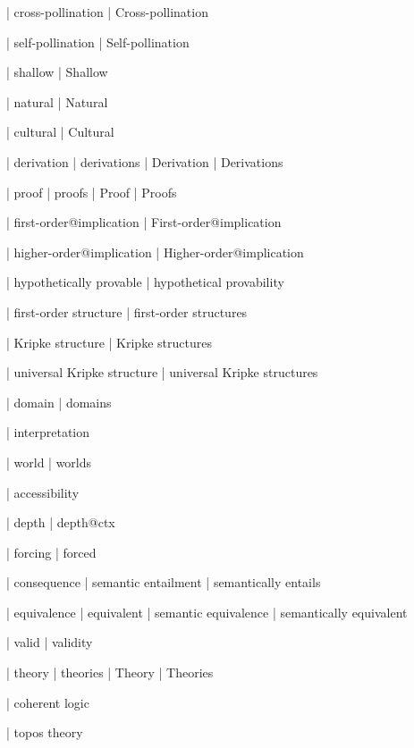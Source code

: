  | cross-pollination
 | Cross-pollination

 | self-pollination
 | Self-pollination

 | shallow
 | Shallow

 | natural
 | Natural

 | cultural
 | Cultural

 | derivation
 | derivations
 | Derivation
 | Derivations

 | proof
 | proofs
 | Proof
 | Proofs
 
 | first-order@implication
 | First-order@implication

 | higher-order@implication
 | Higher-order@implication

 | hypothetically provable
 | hypothetical provability

 | first-order structure
 | first-order structures

 | Kripke structure
 | Kripke structures

 | universal Kripke structure
 | universal Kripke structures

 | domain
 | domains

 | interpretation

 | world
 | worlds

 | accessibility

 | depth
 | depth@ctx

 | forcing
 | forced

 | consequence
 | semantic entailment
 | semantically entails

 | equivalence
 | equivalent
 | semantic equivalence
 | semantically equivalent

 | valid
 | validity

 | theory
 | theories
 | Theory
 | Theories

 | coherent logic

 | topos theory